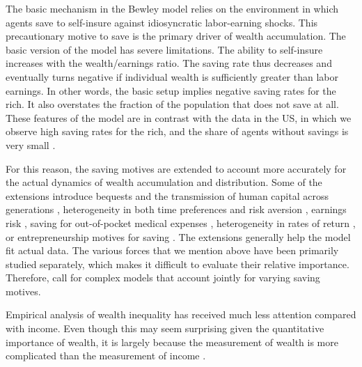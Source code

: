 \begin{refsection}
The basic mechanism in the Bewley model relies on the environment in which agents save to self-insure against idiosyncratic labor-earning shocks. This precautionary motive to save is the primary driver of wealth accumulation. The basic version of the model has severe limitations. The ability to self-insure increases with the wealth/earnings ratio. The saving rate thus decreases and eventually turns negative if individual wealth is sufficiently greater than labor earnings. In other words, the basic setup implies negative saving rates for the rich. It also overstates the fraction of the population that does not save at all. These features of the model are in contrast with the data in the US, in which we observe high saving rates for the rich, and the share of agents without savings is very small \parencite{DENARDI2017280}. 

For this reason, the saving motives are extended to account more accurately for the actual dynamics of wealth accumulation and distribution. Some of the extensions introduce bequests and the transmission of human capital across generations \parencite{nardi2004wealth,de2014bequests}, heterogeneity in both time preferences and risk aversion \parencite{HENDRICKS2007}, earnings risk \parencite{castaneda2003}, saving for out-of-pocket medical expenses \parencite{kopecky2014impact}, heterogeneity in rates of return \parencite{lusardi2017optimal,BENHABIB2015489}, or entrepreneurship motives for saving \parencite{cagetti2006entrepreneurship}. The extensions generally help the model fit actual data. The various forces that we mention above have been primarily studied separately, which makes it difficult to evaluate their relative importance. Therefore, \textcite{DENARDI2017280} call for complex models that account jointly for varying saving motives.

Empirical analysis of wealth inequality has received much less attention compared with income. Even though this may seem surprising given the quantitative importance of wealth, it is largely because the measurement of wealth is more complicated than the measurement of income \parencite{zucman2019}.


\end{refsection}
